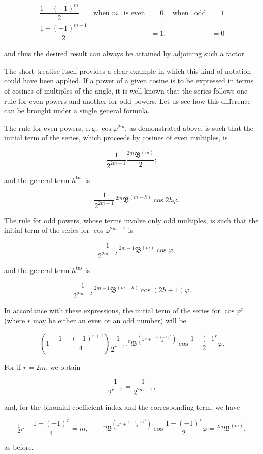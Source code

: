 \[
\begin{array}{rcccccc}
\dfrac{1-(-1)^m}{2}&\text{when }m&\text{is even}&=0,&\text{when}&\text{odd}&=1\\[5pt]
\dfrac{1-(-1)^{m+1}}{2}&\text{—}&\text{—}&=1,&\text{—}&\text{—}&=0
\end{array}
\]

\noindent and thus the desired result can always be attained by adjoining such a factor.

The short treatise itself provides a clear example in which this kind of notation
could have been applied. If a power of a given cosine is to be expressed in
terms of cosines of multiples of the angle, it is well known that the series
follows one rule for even powers and another for odd powers. Let us see how
this difference can be brought under a single general formula.

The rule for even powers, e.\,g. $\cos\varphi^{2m}$, as demonstrated above, is such that the
initial term of the series, which proceeds by cosines of even multiples,
is

\[
\frac{1}{2^{2m-1}}\frac{{}^{2m}\mathfrak{B}^{(m)}}{2};
\]

\noindent and the general term $h^{\text{tus}}$ is

\[
= \frac{1}{2^{2m-1}}\,{}^{2m}\mathfrak{B}^{(m+h)}\cos2h\varphi.
\]

The rule for odd powers, whose terms involve only odd multiples, is such that
the initial term of the series for $\cos\varphi^{2m-1}$ is

\[
= \frac{1}{2^{2m-2}}\,{}^{2m-1}\mathfrak{B}^{(m)}\cos\varphi,
\]

\noindent and the general term $h^{\text{tus}}$ is

\[
\frac{1}{2^{2m-2}}\,{}^{2m-1}\mathfrak{B}^{(m+h)}\cos(2h+1)\varphi.
\]

In accordance with these expressions, the initial term of the series for
$\cos\varphi^r$ (where $r$ may be either an even or an odd number) will be

\[
\left(1-\frac{1-(-1)^{r+1}}{4}\right)\frac{1}{2^{r-1}} . {}^{r}\mathfrak{B}^{\left(\frac{1}{2}r+\frac{1-(-1)^r}{4}\right)}\cos\frac{1-(-1^r}{2}\varphi.
\]

\noindent For if $r=2m$, we obtain

\[
\frac{1}{2^{r-1}} = \frac{1}{2^{2m-1}},
\]

\noindent and, for the binomial coefficient index and the corresponding term, we have

\[
\tfrac{1}{2}r+\frac{1-(-1)^r}{4} = m,\qquad {}^{r}\mathfrak{B}^{\left(\frac{1}{2}r+\frac{1-(-1)^r}{4}\right)}\cos\frac{1-(-1)^r}{2}\varphi = {}^{2m}\mathfrak{B}^{(m)},
\]

\noindent as before.

